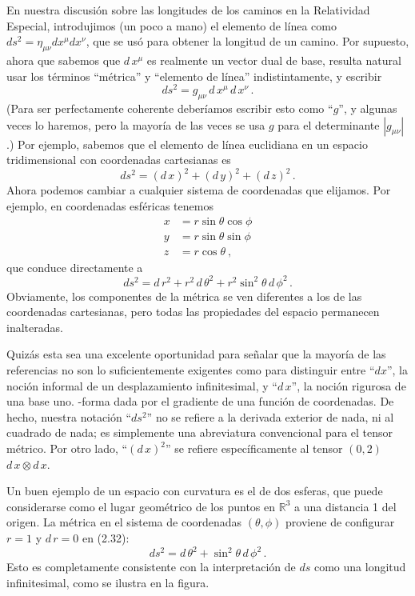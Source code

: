 \documentclass[11pt,b5paper,openany,twoside]{book}
\newcommand{\mn}{{\mu\nu}}
\newcommand{\R}{\mathbb{R}}
\begin{document}
En nuestra discusión sobre las longitudes de los caminos en la Relatividad Especial, introdujimos (un poco a mano) el elemento de línea como $ds^2 = \eta_\mn dx^\mu dx^\nu$, que se usó para obtener la longitud de un camino.
Por supuesto, ahora que sabemos que $ d\,x^\mu$ es realmente un vector dual de base, resulta natural usar los términos ``métrica'' y ``elemento de línea'' indistintamente, y escribir
\begin{equation}
ds^2 = g_\mn \, d\,x^\mu \, d\,x^\nu\,.\label{2.29}
\end{equation}
(Para ser perfectamente coherente deberíamos escribir esto como ``$g$'', y algunas veces lo haremos, pero la mayoría de las veces se usa $g$ para el determinante $|g_\mn|$.)
Por ejemplo, sabemos que el elemento de línea euclidiana en un espacio tridimensional con coordenadas cartesianas es
\begin{equation}
ds^2 = ( d\,x)^2 + ( d\,y)^2 + ( d\,z)^2\,.\label{2.30}
\end{equation}
Ahora podemos cambiar a cualquier sistema de coordenadas que elijamos.
Por ejemplo, en coordenadas esféricas tenemos
\begin{align}
x &=  r\sin\theta \cos\phi\nonumber \\
y &=  r\sin\theta \sin\phi\nonumber \\ z &=  r\cos\theta\ , \label{2.31}
\end{align}
que conduce directamente a
\begin{equation}
ds^2 =  d\,r^2 + r^2 \, d\,\theta^2 + r^2\sin^2\theta\, d\,\phi^2\,.\label{2.32}
\end{equation}
Obviamente, los componentes de la métrica se ven diferentes a los de las coordenadas cartesianas, pero todas las propiedades del espacio permanecen inalteradas.

Quizás esta sea una excelente oportunidad para señalar que la mayoría de las referencias no son lo suficientemente exigentes como para distinguir entre ``$dx$'', la noción informal de un desplazamiento infinitesimal, y ``$ d\,x$'', la noción rigurosa de una base uno. -forma dada por el gradiente de una función de coordenadas.
De hecho, nuestra notación ``$ds^2$'' no se refiere a la derivada exterior de nada, ni al cuadrado de nada; es simplemente una abreviatura convencional para el tensor métrico.
Por otro lado, ``$( d\,x)^2$'' se refiere específicamente al tensor $(0,2)$ $ d\,x\otimes d\,x$.

Un buen ejemplo de un espacio con curvatura es el de dos esferas, que puede considerarse como el lugar geométrico de los puntos en $\R^3$ a una distancia 1 del origen.
La métrica en el sistema de coordenadas $(\theta, \phi)$ proviene de configurar $r=1$ y $ d\,r=0$ en (2.32):
\begin{equation}
ds^2 =  d\,\theta^2 + \sin^2\theta\, d\,\phi^2\,.\label{2.33}
\end{equation}
Esto es completamente consistente con la interpretación de $ds$ como una longitud infinitesimal, como se ilustra en la figura.
\end{document}
